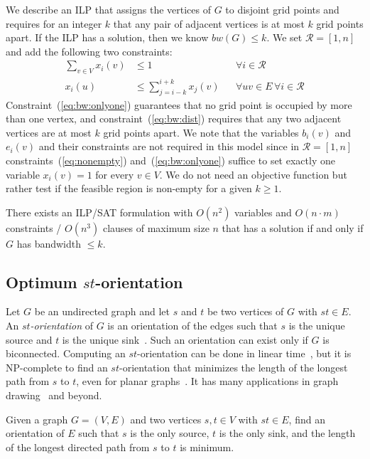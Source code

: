 \documentclass[runningheads]{llncs}
\newcounter{constr}
\begin{document}
We describe an ILP that assigns the vertices of $G$ to disjoint grid
points  and requires for an integer $k$ that any pair of adjacent
vertices is at most $k$ grid points apart. If the ILP has a solution,
then we know $bw(G) \le k$. We set $\mathcal R = [1, n]$ and add the
following two constraints:
\begin{align}
  \label{eq:bw:onlyone} \sum_{v \in V} x_i(v) &\le 1 && \forall i \in
\mathcal R\\
  \label{eq:bw:dist} x_i(u) &\le \sum_{j=i-k}^{i+k} x_j(v) && \forall
uv \in E\,  \forall i \in \mathcal R
\end{align}
Constraint~(\ref{eq:bw:onlyone}) guarantees that no grid point is
occupied by more than one vertex, and constraint~(\ref{eq:bw:dist})
requires that any two adjacent vertices are at most $k$ grid points
apart.
We note that the variables $b_i(v)$ and $e_i(v)$ and their constraints
are not required in this model since in $\mathcal R = [1,n]$
constraints~(\ref{eq:nonempty}) and~(\ref{eq:bw:onlyone}) suffice to
set exactly one variable $x_i(v)=1$ for every $v \in V$.
We do not need an objective function but rather test if the feasible
region is non-empty for a given $k\ge 1$.

\begin{theorem}
There exists an ILP/SAT formulation with $O(n^2)$ variables
and $O(n \cdot m)$ constraints / $O(n^3)$ clauses of maximum size $n$
that has a solution if and only if
$G$ has bandwidth $\leq k$. 
\end{theorem}





\subsection{Optimum $st$-orientation}

Let $G$ be an undirected graph and let $s$ and $t$ be two vertices of
$G$ with $st \in E$.  An {\em $st$-orientation} of $G$ is an
orientation of the edges such
that $s$ is the unique source and $t$ is the unique sink~\cite{ET76}.  Such an
orientation can exist only if $G$ is biconnected. Computing an
$st$-orientation can be done in linear time~\cite{ET76,b-eo-02}, but
it is NP-complete to find an $st$-orientation that minimizes the
length of the longest path from $s$ to $t$, even for planar
graphs~\cite{SZ10}. It has many
applications in graph drawing~\cite{pt-apsto-10} and beyond.

\begin{problem}\label{pb:st}
	Given a graph $G=(V,E)$ and two vertices $s,t \in V$ with $st \in E$, find an orientation of $E$ such that $s$ is the only source, $t$ is the only sink, and the length of the longest directed path from $s$ to $t$ is minimum.
\end{problem}
\end{document}
